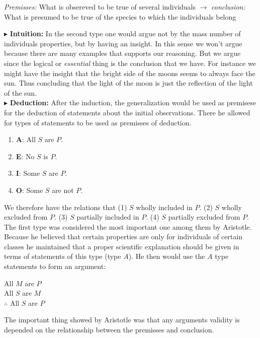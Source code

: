 \documentclass[9pt,a4paper,twocolumn]{article}
\newcounter{def}
\newcommand{\newpoint}[1]{\indent$\blacktriangleright$ \textbf{#1}}
\begin{document}
            \begin{define}
                \textit{Premisses:} What is obsereved to be true of several individuals $\longrightarrow$ \textit{conclusion:} What is presumed to be true of the species to which the individuals belong
            \end{define}
            \newpoint{Intuition:} In the second type one would argue not by the mass number of individuals properties, but by having an insight. In this sense we won't argue because there are many examples that supports our reasoning. But we argue since the logical or \textit{essential} thing is the conclusion that we have. For instance we might have the insight that the bright side of the moons seems to always face the sun. Thus concluding that the light of the moon is just the reflection of the light of the sun.\\
            \newpoint{Deduction:} After the induction, the generalization would be used as premisese for the deduction of statements about the initial observations. There he allowed for types of statements to be used as premisses of deduction.
            \begin{enumerate}
                \item \textbf{A}: All $S$ are $P$. 
                \item \textbf{E}: No $S$ is $P$.
                \item \textbf{I}: Some $S$ are $P$.
                \item \textbf{O}: Some $S$ are not $P$.
            \end{enumerate}
            We therefore have the relations that (1) $S$ wholly included in $P$. (2) $S$ wholly excluded from $P$. (3) $S$ partially included in $P$. (4) $S$ partially excluded from $P$. The first type was considered the most important one among them by Aristotle. Because he believed that certain properties are only for individuals of certain classes he maintained that a proper scientific explanation should be given in terms of statements of this type (type $A$). He then would use the $A$ type statements to form an argument:
            \begin{argue}
                All  $M$ are $P$\\
                All $S$ are $M$\\
                $\therefore$ All $S$ are $P$
            \end{argue}
            The important thing showed by Aristotle was that any arguments validity is depended on the relationship between the premisses and conclusion.\cite{Losee2001-cx}
\end{document}
